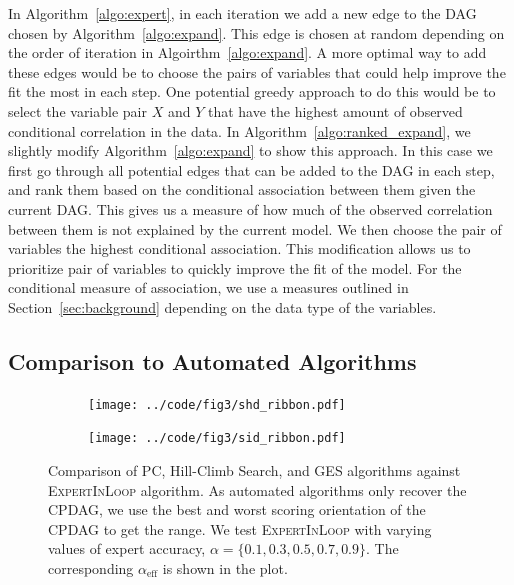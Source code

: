 \documentclass{uai2025} %
\begin{document}
In Algorithm~\ref{algo:expert}, in each iteration we add a new edge to the DAG
chosen by Algorithm~\ref{algo:expand}. This edge is chosen at random depending
on the order of iteration in Algoirthm~\ref{algo:expand}. A more optimal way to
add these edges would be to choose the pairs of variables that could help
improve the fit the most in each step. One potential greedy approach to do this
would be to select the variable pair $ X $ and $ Y $ that have the highest
amount of observed conditional correlation in the data. In
Algorithm~\ref{algo:ranked_expand}, we slightly modify
Algorithm~\ref{algo:expand} to show this approach. In this case we first go
through all potential edges that can be added to the DAG in each step, and rank
them based on the conditional association between them given the current DAG.
This gives us a measure of how much of the observed correlation between them is
not explained by the current model. We then choose the pair of variables the
highest conditional association. This modification allows us to prioritize pair
of variables to quickly improve the fit of the model. For the conditional
measure of association, we use a measures outlined in
Section~\ref{sec:background} depending on the data type of the variables.


\subsection{Comparison to Automated Algorithms}
\begin{figure}[t!]
	\centering
	\begin{subfigure}{0.5\textwidth}
		\centering
		\texttt{[image: ../code/fig3/shd\_ribbon.pdf]}
		\caption{}
	\end{subfigure}
	\begin{subfigure}{0.5\textwidth}
		\centering
		\texttt{[image: ../code/fig3/sid\_ribbon.pdf]}
		\caption{}
	\end{subfigure}
	\caption{Comparison of PC, Hill-Climb Search, and GES algorithms against
		\textsc{ExpertInLoop} algorithm. As automated algorithms only
		recover the CPDAG, we use the best and worst scoring
		orientation of the CPDAG to get the range. We test
		\textsc{ExpertInLoop} with varying values of expert accuracy, $ \alpha = \{0.1, 0.3, 0.5, 0.7, 0.9\} $. The corresponding
		$\alpha_{\textrm{eff}} $ is shown in the plot.}
	\label{fig:shd_sid}
\end{figure}
\end{document}

